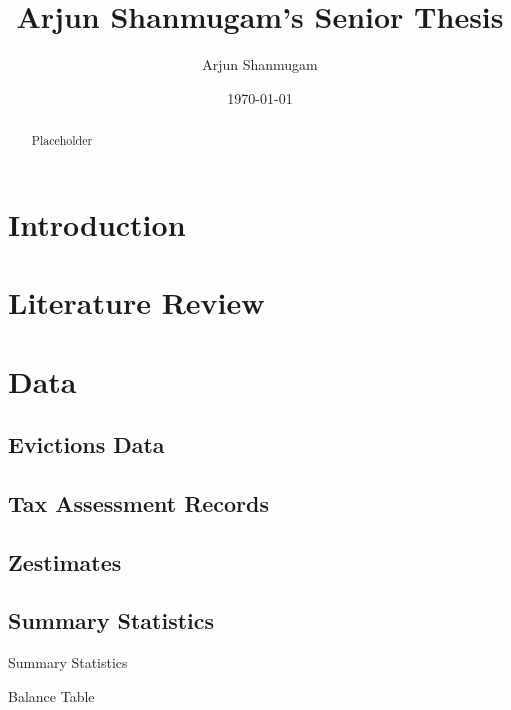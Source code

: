\documentclass[12pt]{article}
\begin{document}
\begin{titlepage}
\title{Arjun Shanmugam's Senior Thesis}
\author{Arjun Shanmugam}
\date{\today}
\maketitle
\begin{abstract}
\noindent Placeholder\\


\bigskip
\end{abstract}
\setcounter{page}{0}
\thispagestyle{empty}
\end{titlepage}
\pagebreak \newpage




\doublespacing


\section{Introduction} \label{sec:introduction}

\section{Literature Review} \label{sec:literature}

\section{Data} \label{sec:data}
    \subsection{Evictions Data}
    \subsection{Tax Assessment Records}
    \subsection{Zestimates}
    
    \begin{landscape}
    \subsection{Summary Statistics}
         \begin{table}[H]
            \centering
            \small
            
            \caption{Summary Statistics}
            \label{tab:table_1}
        \end{table}

        \newpage
        \begin{table}[H]
            \centering
            \small
            
            \caption{Balance Table}
            \label{tab:my_label}
        \end{table}
    \end{landscape}
       
\end{document}
